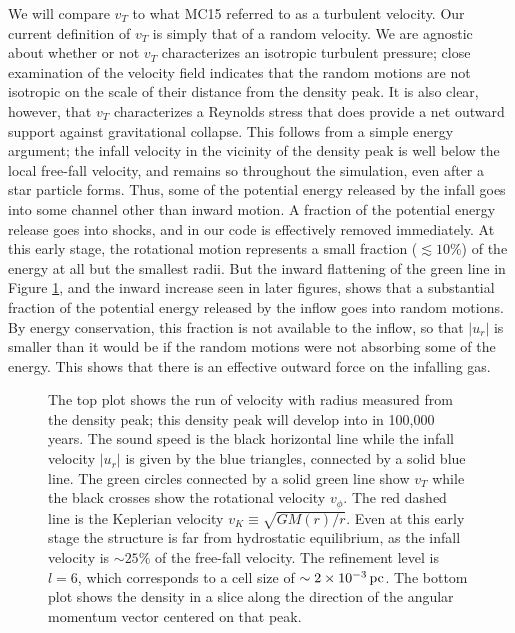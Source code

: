 \documentclass[../dissertation.tex]{subfiles}
\begin{document}
We will compare $v_T$ to what  MC15 referred to as a turbulent velocity. Our current definition of $v_T$ is simply that of a random velocity. 
We are agnostic about whether or not $v_T$ characterizes an isotropic turbulent pressure; close examination of the velocity field indicates that the random motions are not isotropic on the scale of their distance from the density peak. It is also clear, however, that $v_T$ characterizes a Reynolds stress that does provide a net outward support against gravitational collapse. This follows from a simple energy argument; the infall velocity in the vicinity of the density peak is well below the local free-fall velocity, and remains so throughout the simulation, even after a star particle forms. Thus, some of the potential energy released by the infall goes into some channel other than inward motion. A fraction of the potential energy release goes into shocks, and in our code is effectively removed immediately. At this early stage, the rotational motion represents a small fraction ($\lesssim10\%$) of the energy at all but the smallest radii. But the inward flattening of the green line in Figure
\ref{fig:hydro_Sphere_of_influence_quad2_well_before}, and the inward increase seen in later figures, shows that a substantial fraction of the potential energy released by the inflow goes into random motions. By energy conservation, this fraction is not available to the inflow, so that $|u_r|$ is smaller than it would be if the random motions were not absorbing some of the energy. This shows that there is an effective outward force on the infalling gas. 
%
\begin{figure}[htb] %
\caption[Hydro Sphere of Influence]{\label{fig:hydro_Sphere_of_influence_quad2_well_before}The top plot shows the run of velocity with radius measured from the density peak; 
this density peak will develop into \partA in 100,000 years.
The sound speed is the black horizontal line while the infall velocity 
$|u_r|$ is given by the blue triangles, connected by a solid blue line.
The green circles connected by a solid green line show 
$v_T$ while the black crosses show the rotational velocity $v_\phi$.
The red dashed line is the Keplerian velocity $v_K\equiv\sqrt{GM(r)/r}$.
Even at this early stage the structure is far from hydrostatic equilibrium, 
as the infall velocity is $\sim 25\%$ of the free-fall velocity.
The refinement level is $l = 6$, which corresponds to a cell size of $\sim2\times10^{-3}\,\rm pc$.
The bottom plot shows the density in a slice along the direction of the 
angular momentum vector centered on that peak.}
\end{figure}
%
\end{document}
